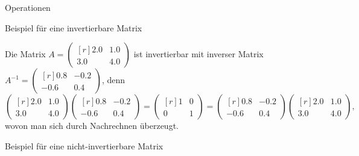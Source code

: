 \documentclass[
  8pt,
  ignorenonframetext,
]{beamer}
\begin{document}
\begin{frame}{Operationen}
\protect\hypertarget{operationen-24}{}
\small

Beispiel für eine invertierbare Matrix \footnotesize

Die Matrix
\(A = \begin{pmatrix*}[r] 2.0 & 1.0 \\ 3.0 & 4.0 \end{pmatrix*}\) ist
invertierbar mit inverser Matrix
\(A^{-1} = \begin{pmatrix*}[r] 0.8 & -0.2 \\ -0.6 & 0.4 \end{pmatrix*}\),
denn \begin{equation}
\begin{pmatrix*}[r] 2.0 &  1.0 \\   3.0 & 4.0 \end{pmatrix*}
\begin{pmatrix*}[r] 0.8 & -0.2 \\  -0.6 & 0.4 \end{pmatrix*}
=
\begin{pmatrix*}[r] 1 & 0 \\ 0 & 1 \end{pmatrix*}
=
\begin{pmatrix*}[r] 0.8 & -0.2  \\  -0.6 & 0.4 \end{pmatrix*}
\begin{pmatrix*}[r] 2.0 &  1.0  \\   3.0 & 4.0 \end{pmatrix*},
\end{equation} wovon man sich durch Nachrechnen überzeugt. \vspace{3mm}

\small

Beispiel für eine nicht-invertierbare Matrix \footnotesize


\end{frame}
\end{document}

